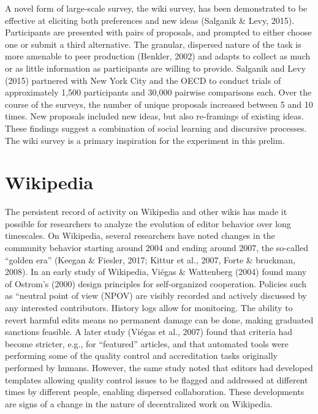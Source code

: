 A novel form of large-scale survey, the wiki survey, has been demonstrated to be effective at eliciting both preferences and new ideas (Salganik \& Levy, 2015). Participants are presented with pairs of proposals, and prompted to either choose one or submit a third alternative. The granular, dispersed nature of the task is more amenable to peer production (Benkler, 2002) and adapts to collect as much or as little information as participants are willing to provide. Salganik and Levy (2015) partnered with New York City and the OECD to conduct trials of approximately 1,500 participants and 30,000 pairwise comparisons each. Over the course of the surveys, the number of unique proposals increased between 5 and 10 times. New proposals included new ideas, but also re-framings of existing ideas. These findings suggest a combination of social learning and discursive processes. The wiki survey is a primary inspiration for the experiment in this prelim.

\section{Wikipedia}
The persistent record of activity on Wikipedia and other wikis has made it possible for researchers to analyze the evolution of editor behavior over long timescales. On Wikipedia, several researchers have noted changes in the community behavior starting around 2004 and ending around 2007, the so-called “golden era” (Keegan \& Fiesler, 2017; Kittur et al., 2007, Forte \& bruckman, 2008). In an early study of Wikipedia, Vi\'egas \& Wattenberg (2004) found many of Ostrom’s (2000) design principles for self-organized cooperation. Policies such as “neutral point of view (NPOV) are visibly recorded and actively discussed by any interested contributors. History logs allow for monitoring. The ability to revert harmful edits means no permanent damage can be done, making graduated sanctions feasible. A later study (Vi\'egas et al., 2007) found that criteria had become stricter, e.g., for “featured” articles, and that automated tools were performing some of the quality control and accreditation tasks originally performed by humans. However, the same study noted that editors had developed templates allowing quality control issues to be flagged and addressed at different times by different people, enabling dispersed collaboration. These developments are signs of a change in the nature of decentralized work on Wikipedia.

